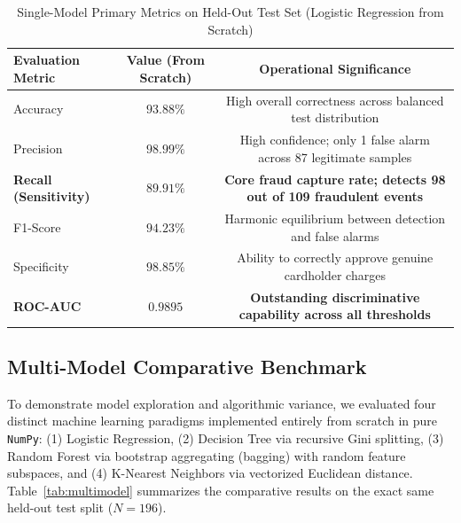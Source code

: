 \documentclass[11pt,a4paper]{article}
\begin{document}
\begin{table}[H]
    \centering
    \caption{Single-Model Primary Metrics on Held-Out Test Set (Logistic Regression from Scratch)}
    \label{tab:results}
    \begin{tabular}{lcc}
        \toprule
        \textbf{Evaluation Metric} & \textbf{Value (From Scratch)} & \textbf{Operational Significance} \\
        \midrule
        Accuracy & $93.88\%$ & High overall correctness across balanced test distribution \\
        Precision & $98.99\%$ & High confidence; only 1 false alarm across 87 legitimate samples \\
        \textbf{Recall (Sensitivity)} & $\mathbf{89.91\%}$ & \textbf{Core fraud capture rate; detects 98 out of 109 fraudulent events} \\
        F1-Score & $94.23\%$ & Harmonic equilibrium between detection and false alarms \\
        Specificity & $98.85\%$ & Ability to correctly approve genuine cardholder charges \\
        \textbf{ROC-AUC} & $\mathbf{0.9895}$ & \textbf{Outstanding discriminative capability across all thresholds} \\
        \bottomrule
    \end{tabular}
\end{table}

\subsection{Multi-Model Comparative Benchmark}
To demonstrate model exploration and algorithmic variance, we evaluated four distinct machine learning paradigms implemented entirely from scratch in pure \texttt{NumPy}: (1) Logistic Regression, (2) Decision Tree via recursive Gini splitting, (3) Random Forest via bootstrap aggregating (bagging) with random feature subspaces, and (4) K-Nearest Neighbors via vectorized Euclidean distance. Table~\ref{tab:multimodel} summarizes the comparative results on the exact same held-out test split ($N=196$).
\end{document}
